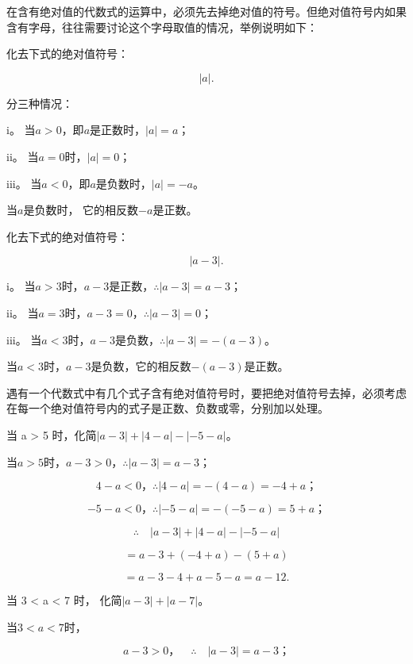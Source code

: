 在含有绝对值的代数式的运算中，必须先去掉绝对值的符号。但绝对值符号内如果含有字母，往往需要讨论这个字母取值的情况，举例说明如下：

 化去下式的绝对值符号：

\[
| a |.
\]

 分三种情况：

i。 当\(a > 0\)，即\(a\)是正数时，\(|a| = a\)；

ii。 当\(a = 0\)时，\(|a| = 0\)；

iii。 当\(a < 0\)，即\(a\)是负数时，\(|a| = -a\)。

 当\(a\)是负数时， 它的相反数\(-a\)是正数。

 化去下式的绝对值符号：

\[
\left| a - 3 \right|.
\]

 i。
当\(a > 3\)时，\(a - 3\)是正数，\(\therefore |a - 3| = a - 3\)；

ii。 当\(a = 3\)时，\(a - 3 = 0\)，\(\therefore |a - 3| = 0\)；

iii。
当\(a < 3\)时，\(a - 3\)是负数，\(\therefore |a - 3| = -(a - 3)\)。

当\(a < 3\)时，\(a - 3\)是负数，它的相反数\(-(a - 3)\)是正数。

遇有一个代数式中有几个式子含有绝对值符号时，要把绝对值符号去掉，必须考虑在每一个绝对值符号内的式子是正数、负数或零，分别加以处理。

 当 a \textgreater{} 5
时，化简\(\left|a - 3\right| + \left|4 - a\right| - \left|-5 - a\right|\)。

当\(a > 5\)时，\(a - 3 > 0\)，\(\therefore |a - 3| = a - 3\)；

\[
4 - a < 0\text{，} \therefore | 4 - a | = - (4 - a) = - 4 + a\text{；}
\]

\[
- 5 - a < 0\text{，} \therefore | - 5 - a | = - (- 5 - a) = 5 + a\text{；}
\]

\[
\therefore \quad | a - 3 | + | 4 - a | - | - 5 - a |
\]

\[
= a - 3 + (- 4 + a) - (5 + a)
\]

\[
= a - 3 - 4 + a - 5 - a = a - 12.
\]

 当 3 \textless{} a \textless{} 7 时，
化简\(\left|a - 3\right| + \left|a - 7\right|\)。

 当\(3 < a < 7\)时，

\[
a - 3 > 0\text{，} \quad \therefore \quad | a - 3 | = a - 3\text{；}
\]


